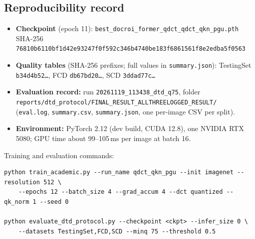 \documentclass[11pt,a4paper]{article}
\begin{document}
\subsection{Reproducibility record}
\begin{itemize}
  \item \textbf{Checkpoint} (epoch 11): \texttt{best\_docroi\_former\_qdct\_qdct\_qkn\_pgu.pth}\\
        SHA-256 {\footnotesize\texttt{76810b6110bf1d42e93247f0f592c346b4740be183f6861561f8e2edba5f0563}}
  \item \textbf{Quality tables} (SHA-256 prefixes; full values in \texttt{summary.json}):
        TestingSet \texttt{b34d4b52\dots}, FCD \texttt{db67bd20\dots}, SCD \texttt{3ddad77c\dots}
  \item \textbf{Evaluation record:} run \texttt{20261119\_113438\_dtd\_q75}, folder\\
        \texttt{reports/dtd\_protocol/FINAL\_RESULT\_ALLTHREELOGGED\_RESULT/}\\
        (\texttt{eval.log}, \texttt{summary.csv}, \texttt{summary.json}, one per-image CSV per split).
  \item \textbf{Environment:} PyTorch 2.12 (dev build, CUDA 12.8), one NVIDIA RTX 5080; GPU time
        about 99--105\,ms per image at batch 16.
\end{itemize}
Training and evaluation commands:
{\footnotesize
\begin{verbatim}
python train_academic.py --run_name qdct_qkn_pgu --init imagenet --resolution 512 \
    --epochs 12 --batch_size 4 --grad_accum 4 --dct quantized --qk_norm 1 --seed 0

python evaluate_dtd_protocol.py --checkpoint <ckpt> --infer_size 0 \
    --datasets TestingSet,FCD,SCD --minq 75 --threshold 0.5
\end{verbatim}
}

\end{document}

